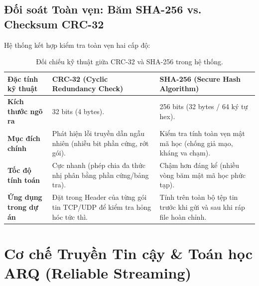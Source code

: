 \documentclass[11pt,a4paper]{article}
\begin{document}
\subsection{Đối soát Toàn vẹn: Băm SHA-256 vs. Checksum CRC-32}
Hệ thống kết hợp kiểm tra toàn vẹn hai cấp độ:
\begin{table}[htbp]
\centering
\small
\begin{tabularx}{\textwidth}{p{3.5cm}Xp{5.5cm}}
\toprule
\rowcolor{headergray}
\textbf{Đặc tính kỹ thuật} & \textbf{CRC-32 (Cyclic Redundancy Check)} & \textbf{SHA-256 (Secure Hash Algorithm)} \\
\midrule
\textbf{Kích thước ngõ ra} & 32 bits (4 bytes). & 256 bits (32 bytes / 64 ký tự hex). \\
\textbf{Mục đích chính} & Phát hiện lỗi truyền dẫn ngẫu nhiên (nhiễu bit phần cứng, rớt gói). & Kiểm tra tính toàn vẹn mật mã học (chống giả mạo, kháng va chạm). \\
\textbf{Tốc độ tính toán} & Cực nhanh (phép chia đa thức nhị phân bằng phần cứng/bảng tra). & Chậm hơn đáng kể (nhiều vòng băm mật mã học phức tạp). \\
\textbf{Ứng dụng trong dự án} & Đặt trong Header của từng gói tin TCP/UDP để kiểm tra hỏng hóc tức thì. & Tính trên toàn bộ tệp tin trước khi gửi và sau khi ráp file hoàn chỉnh. \\
\bottomrule
\end{tabularx}
\caption{Đối chiếu kỹ thuật giữa CRC-32 và SHA-256 trong hệ thống.}
\label{tab:crc_vs_sha}
\end{table}

\newpage

\section{Cơ chế Truyền Tin cậy \& Toán học ARQ (Reliable Streaming)}
\end{document}
